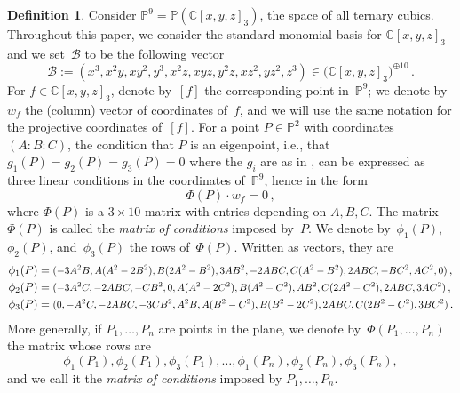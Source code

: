 \documentclass[a4paper, 11pt, reqno]{amsart}
\theoremstyle{plain}
\theoremstyle{definition}
\newtheorem{definition}[lemma]{Definition}
\newcommand{\C}{\mathbb{C}}
\newcommand{\p}{\mathbb{P}}
\newcommand\scalemath[2]{\scalebox{#1}{\mbox{\ensuremath{\displaystyle #2}}}}
\begin{document}
\begin{definition}
\label{definition:matrix_conditions}
Consider $\p^9 = \p(\C[x,y,z]_3)$, the space of all ternary cubics.
Throughout this paper, we consider the standard monomial basis for $\C[x,y,z]_3$ and we set~$\mathcal{B}$ to be the following vector
%
\begin{equation}
\label{eq:vector_basis}
  \mathcal{B} := (x^3, x^2 y, x y^2, y^3, x^2 z, x y z, y^2 z, x z^2, y z^2, z^3)
  \in \bigl( \C[x,y,z]_3 \bigr)^{\oplus 10} \,.
\end{equation}
For $f \in \C[x,y,z]_3$, denote by~$[f]$ the corresponding point in~$\p^9$; we denote by~$w_f$ the (column) vector of coordinates of~$f$, and we will use the same notation for the projective coordinates of~$[f]$.
For a point $P \in \p^2$ with coordinates $(A: B: C)$, the condition that $P$ is an eigenpoint,
i.e., that $g_1(P) = g_2(P) = g_3(P) = 0$ where the $g_i$ are as in ,
can be expressed as three linear conditions in the coordinates of~$\p^9$,
hence in the form
%
\[
  \Phi(P) \cdot w_f = 0 \,,
\]
%
where $\Phi(P)$ is a $3 \times 10$ matrix with entries depending on $A, B, C$.
The matrix $\Phi(P)$ is called the \emph{matrix of conditions} imposed by~$P$.
We denote by~$\phi_1(P)$, $\phi_2(P)$, and~$\phi_3(P)$ the rows of~$\Phi(P)$.
Written as vectors, they are
%
\begin{equation}
\label{eq:matrix_conditions_rows}
  \begin{aligned}
    \phi_1(P) &=
    \scalemath{0.9}{
    (-3A^2B, A(A^2 - 2B^2), B(2A^2 - B^2), 3AB^2,
     -2ABC, C(A^2 - B^2), 2 ABC,
     -B C^2, A C^2, 0)} \,, \\
    \phi_2(P) &=
    \scalemath{0.9}{
    (-3A^2 C,
     -2ABC,
     -CB^2,
     0,
     A(A^2-2C^2),
     B(A^2 - C^2),
     AB^2,
     C(2A^2-C^2),
     2ABC,
     3AC^2)} \,,\\
    \phi_3(P) &=
    \scalemath{0.9}{
    (0,
     -A^2C,
     -2ABC,
     -3CB^2,
     A^2 B,
     A(B^2 - C^2),
     B(B^2-2C^2),
     2ABC,
     C(2B^2-C^2),
     3BC^2)} \,.
  \end{aligned}
\end{equation}
%
More generally, if $P_1, \dotsc, P_n$ are points in the plane, we denote by~$\Phi(P_1, \dotsc, P_n)$ the matrix whose rows are
%
\[
  \phi_1(P_1), \phi_2(P_1), \phi_3(P_1),
  \dotsc,
  \phi_1(P_n), \phi_2(P_n), \phi_3(P_n),
\]
%
and we call it the
\emph{matrix of conditions} imposed by $P_1, \dotsc, P_n$.
\end{definition}
\end{document}
